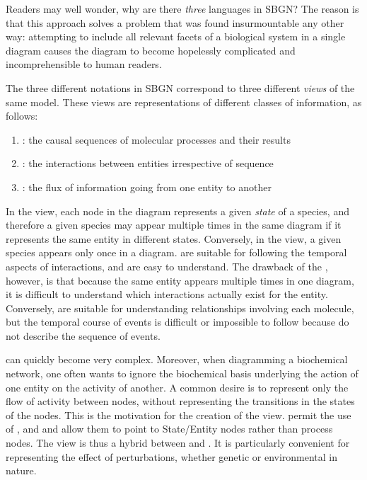 Readers may well wonder, why are there \emph{three} languages in SBGN?  The reason is that this approach solves a problem that was found insurmountable any other way: attempting to include all relevant facets of a biological system in a single diagram causes the diagram to become hopelessly complicated and incomprehensible to human readers.

The three different notations in SBGN correspond to three different \emph{views} of the same model.  These views are representations of different classes of information, as follows:

\begin{enumerate}\setlength{\parskip}{0ex}

\item \emph{\PD{}}: the causal sequences of molecular processes and their
  results

\item \emph{\ER{}}: the interactions between entities irrespective of
sequence

\item \emph{\AF{}}: the flux of information going from one entity to
another

\end{enumerate}

In the \PD{} view, each node in the diagram represents a given \emph{state} of a species, and therefore a given species may appear multiple times in the same diagram if it represents the same entity in different states.  Conversely, in the \ER{} view, a given species appears only once in a diagram.  \PDs{} are suitable for following the temporal aspects of interactions, and are easy to understand.  The drawback of the \PD{}, however, is that because the same entity appears multiple times in one diagram, it is difficult to understand which interactions actually exist for the entity.  Conversely, \ERs{} are suitable for understanding relationships involving each molecule, but the temporal course of events is difficult or impossible to follow because \ERs do not describe the sequence of events.

\PDs{} can quickly become very complex.  Moreover, when diagramming a biochemical network, one often wants to ignore the biochemical basis underlying the action of one entity on the activity of another.  A common desire is to represent only the flow of activity between nodes, without representing the transitions in the states of the nodes.  This is the motivation for the creation of the \AF view.  \AFs permit the use of ,  and  and allow them to point to State/Entity nodes rather than process nodes.  The \AF view is thus a hybrid between \PD and \ERs.  It is particularly convenient for representing the effect of perturbations, whether genetic or environmental in nature.

